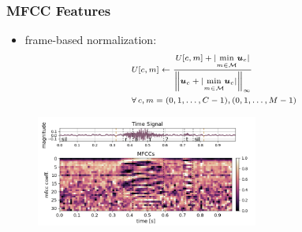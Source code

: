 \begin{frame}
  \frametitle{MFCC Features}
  \begin{itemize}
    \item frame-based normalization:
    \vspace{0.2cm}
    \begin{equation*}
      \scriptsize
      \begin{aligned}
        &U[c, m] \gets \frac{U[c, m] + \vert \underset{m \in \mathcal{M}}{\min} \bm{u}_c \vert}{\norm{\bm{u}_c + \vert \underset{m \in \mathcal{M}}{\min} \bm{u}_c \vert}_\infty}\\
        & \forall \, c, m = (0, 1, \dots, C - 1), (0, 1, \dots, M - 1)
      \end{aligned}
    \end{equation*}
  \end{itemize}
  \vspace{-0.25cm}
  \begin{figure} \includegraphics[width=0.65\textwidth]{../3_signal/figs/signal_mfcc_showcase_mfcc32_right0.png} \end{figure}
\end{frame}

